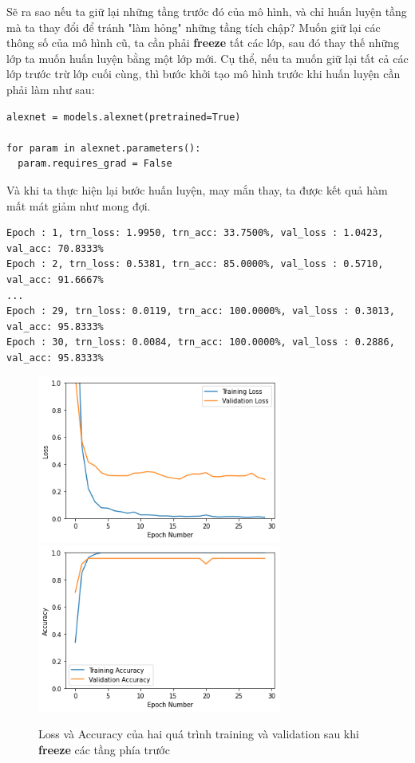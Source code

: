 \documentclass[a4paper]{article}
\begin{document}
Sẽ ra sao nếu ta giữ lại những tầng trước đó của mô hình, và chỉ huấn luyện tầng mà ta thay đổi để tránh "làm hỏng" những tầng tích chập? Muốn giữ lại các thông số của mô hình cũ, ta cần phải \textbf{freeze} tất các lớp, sau đó thay thế những lớp ta muốn huấn luyện bằng một lớp mới. Cụ thể, nếu ta muốn giữ lại tất cả các lớp trước trừ lớp cuối cùng, thì bước khởi tạo mô hình trước khi huấn luyện cần phải làm như sau:
\begin{lstlisting}
alexnet = models.alexnet(pretrained=True)

for param in alexnet.parameters():
  param.requires_grad = False
\end{lstlisting}
Và khi ta thực hiện lại bước huấn luyện, may mắn thay, ta được kết quả hàm mất mát giảm như mong đợi.
\begin{verbatim}
Epoch : 1, trn_loss: 1.9950, trn_acc: 33.7500%, val_loss : 1.0423, val_acc: 70.8333%
Epoch : 2, trn_loss: 0.5381, trn_acc: 85.0000%, val_loss : 0.5710, val_acc: 91.6667%
...
Epoch : 29, trn_loss: 0.0119, trn_acc: 100.0000%, val_loss : 0.3013, val_acc: 95.8333%
Epoch : 30, trn_loss: 0.0084, trn_acc: 100.0000%, val_loss : 0.2886, val_acc: 95.8333%
\end{verbatim}

\begin{figure}[h!]
\centering
{{\includegraphics[width=8cm]{images/loss1.png} }}
\qquad
{{\includegraphics[width=8cm]{images/acc1.png} }}
\caption{Loss và Accuracy của hai quá trình training và validation sau khi \textbf{freeze} các tầng phía trước}
\end{figure}
\end{document}
